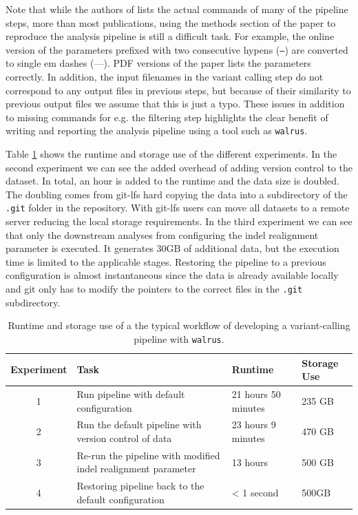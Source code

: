 Note that while the authors of \cite{cornish2015comparison} lists the actual
commands of many of the pipeline steps, more than most publications, using the
methods section of the paper to reproduce the analysis pipeline is still a
difficult task.  For example, the online version of \cite{cornish2015comparison}
the parameters prefixed with two consecutive hypens (\texttt{--}) are converted
to single em dashes (---).  PDF versions of the paper lists the parameters
correctly.  In addition, the input filenames in the variant calling step do not
correspond to any output files in previous steps, but because of their
similarity to previous output files we assume that this is just a typo. These
issues in addition to missing commands for e.g. the filtering step highlights
the clear benefit of writing and reporting the analysis pipeline using a tool
such as \texttt{walrus}. 

Table \ref{resultstable} shows the runtime and storage use of the different
experiments. In the second experiment we can see the added overhead of adding
version control to the dataset. In total, an hour is added to the runtime and
the data size is doubled. The doubling comes from git-lfs hard copying the data
into a subdirectory of the \texttt{.git} folder in the repository. With git-lfs
users can move all datasets to a remote server reducing the local storage
requirements. 
In the third experiment we can see that only the downstream analyses from
configuring the indel realignment parameter is executed. It generates 30GB of
additional data, but the execution time is limited to the applicable stages.
Restoring the pipeline to a previous configuration is almost instantaneous since
the data is already available locally and git only has to modify the pointers to
the correct files in the \texttt{.git} subdirectory. 

\begin{table}[ht!]
    \centering
    \caption{Runtime and storage use of a the typical workflow of developing a
    variant-calling pipeline with \texttt{walrus}.} 
    \begin{tabular}{ | c | p{2.5cm} | p{2cm} | p{1cm} |}
    \hline
    Experiment & Task & Runtime & Storage Use \\ \hline
    1 & Run pipeline with default configuration & 21 hours 50 minutes & 235 GB
        \\ \hline
    2 & Run the default pipeline with version control of data & 23 hours 9
        minutes & 470 GB \\ \hline
    3 & Re-run the pipeline with modified indel realignment parameter & 13 hours
        & 500 GB \\ \hline
    4 & Restoring pipeline back to the default configuration & < 1 second &
        500GB \\ \hline
    \end{tabular}
    \label{resultstable}
\end{table}

